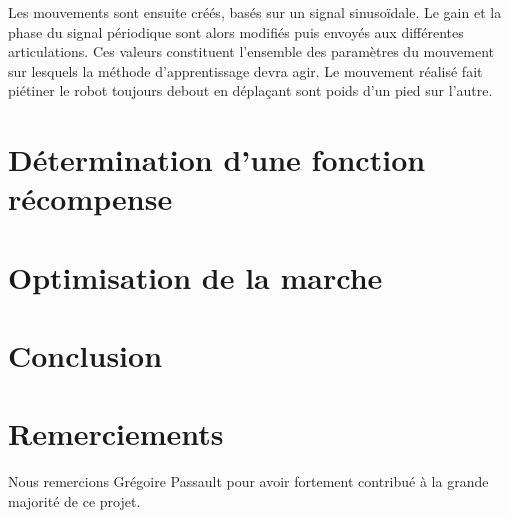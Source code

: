 \documentclass[11pt]{article}
\begin{document}
Les mouvements sont ensuite créés, basés sur un signal sinusoïdale. Le gain et la phase du signal périodique 
sont alors modifiés puis envoyés aux différentes articulations. Ces valeurs constituent l'ensemble des paramètres
du mouvement sur lesquels la méthode d'apprentissage devra agir. Le mouvement réalisé fait piétiner le robot 
toujours debout en déplaçant sont poids d'un pied sur l'autre.

\section{Détermination d'une fonction récompense}
\section{Optimisation de la marche}
\section{Conclusion}

\section{Remerciements}
Nous remercions Grégoire Passault pour avoir fortement contribué à la grande majorité de ce projet.
\end{document}
